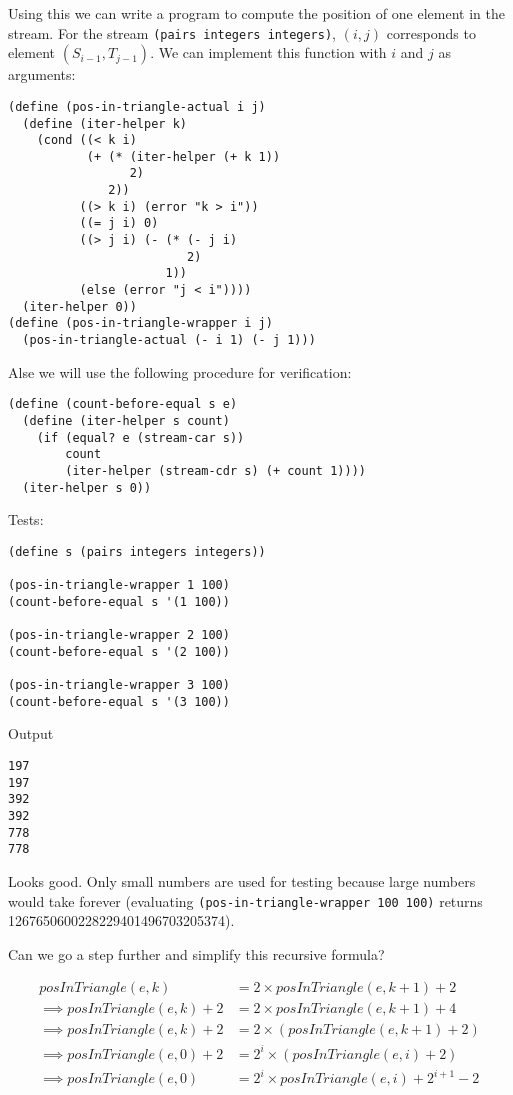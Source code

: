\documentclass[../main.tex]{subfiles}
\begin{document}
Using this we can write a program to compute the position of one element in the stream. For the stream \lstinline{(pairs integers integers)}, $(i, j)$ corresponds to element $(S_{i-1}, T_{j-1})$. We can implement this function with $i$ and $j$ as arguments:

\begin{lstlisting}
(define (pos-in-triangle-actual i j)
  (define (iter-helper k)
    (cond ((< k i)
           (+ (* (iter-helper (+ k 1))
                 2)
              2))
          ((> k i) (error "k > i"))
          ((= j i) 0)
          ((> j i) (- (* (- j i)
                         2)
                      1))
          (else (error "j < i"))))
  (iter-helper 0))
(define (pos-in-triangle-wrapper i j)
  (pos-in-triangle-actual (- i 1) (- j 1)))
\end{lstlisting}

Alse we will use the following procedure for verification:

\begin{lstlisting}
(define (count-before-equal s e)
  (define (iter-helper s count)
    (if (equal? e (stream-car s))
        count
        (iter-helper (stream-cdr s) (+ count 1))))
  (iter-helper s 0))
\end{lstlisting}

Tests:

\begin{lstlisting}
(define s (pairs integers integers))

(pos-in-triangle-wrapper 1 100)
(count-before-equal s '(1 100))

(pos-in-triangle-wrapper 2 100)
(count-before-equal s '(2 100))

(pos-in-triangle-wrapper 3 100)
(count-before-equal s '(3 100))
\end{lstlisting}

Output

\begin{lstlisting}
197
197
392
392
778
778
\end{lstlisting}

Looks good. Only small numbers are used for testing because large numbers would take forever (evaluating \lstinline{(pos-in-triangle-wrapper 100 100)} returns 1267650600228229401496703205374).

Can we go a step further and simplify this recursive formula?

\begin{align*}
posInTriangle(e, k) &= 2 \times posInTriangle(e, k + 1) + 2\\
\implies posInTriangle(e, k) + 2 &= 2 \times posInTriangle(e, k + 1) + 4\\
\implies posInTriangle(e, k) + 2 &= 2 \times (posInTriangle(e, k + 1) + 2)\\
\implies posInTriangle(e, 0) + 2 &= 2 ^ i \times (posInTriangle(e, i) + 2)\\
\implies posInTriangle(e, 0) &= 2 ^ i \times posInTriangle(e, i) + 2 ^ {i + 1} - 2
\end{align*}
\end{document}
